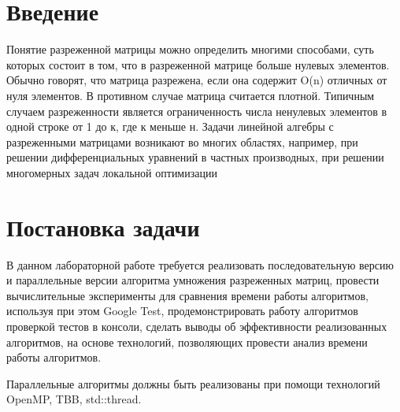 \documentclass{report}
\begin{document}
\setcounter{page}{2}

\tableofcontents
\newpage

\section*{Введение}
\par Понятие разреженной матрицы можно определить многими способами, суть которых состоит в том, что в разреженной матрице больше нулевых элементов. Обычно говорят, что матрица разрежена, если она содержит  O(n) отличных от нуля элементов. В противном случае матрица считается плотной. Типичным случаем разреженности является ограниченность числа ненулевых элементов в одной строке от 1 до к, где к меньше н. Задачи линейной алгебры с разреженными матрицами возникают во многих областях, например, при решении дифференциальных уравнений в частных производных, при решении многомерных задач локальной оптимизации
\newpage

\section*{Постановка задачи}
\par В данном лабораторной работе требуется реализовать последовательную версию и параллельные версии алгоритма умножения разреженных матриц, провести вычислительные эксперименты для сравнения времени работы алгоритмов, используя при этом Google Test, продемонстрировать работу алгоритмов проверкой тестов в консоли, сделать выводы об эффективности реализованных алгоритмов, на основе технологий, позволяющих провести анализ времени работы алгоритмов.
\par Параллельные алгоритмы должны быть реализованы при помощи технологий OpenMP, TBB, std::thread.
\newpage

\end{document}

